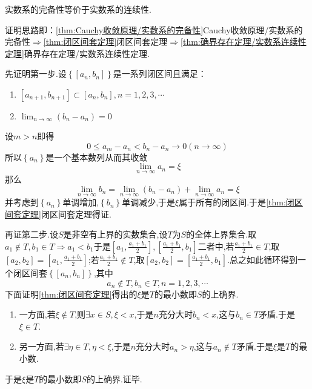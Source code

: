 \begin{formal}
    \begin{theorem}[实数系的连续性与完备性]\label{thm:实数系的连续性与完备性}
        实数系的完备性等价于实数系的连续性.
    \end{theorem}
    \begin{Proof}
        证明思路即：\cref{thm:Cauchy收敛原理/实数系的完备性}\textup{Cauchy}收敛原理/实数系的完备性$\Longrightarrow$\cref{thm:闭区间套定理}闭区间套定理$\Longrightarrow$\cref{thm:确界存在定理/实数系连续性定理}确界存在定理/实数系连续性定理.

        先证明第一步.设$\left\{\left[a_n,b_n\right]\right\}$是一系列闭区间且满足：\begin{enumerate}[label={\textup{(\arabic*)}}]
            \item $\left[a_{n+1},b_{n+1}\right]\subset\left[a_n,b_n\right],n=1,2,3,\cdots$
            \item $\displaystyle\lim_{n\to\infty}\left(b_n-a_n\right)=0$
        \end{enumerate}设$m>n$即得\[
        0\leqslant a_m-a_n<b_n-a_n\to0\left(
            n\to\infty
        \right)
        \]所以$\left\{a_n\right\}$是一个基本数列从而其收敛\[
        \lim_{n\to\infty}a_n=\xi
        \]那么\[
        \lim_{n\to\infty}b_n=\lim_{n\to\infty}\left(b_n-a_n\right)+\lim_{n\to\infty}a_n=\xi
        \]并考虑到$\left\{a_n\right\}$单调增加,$\left\{b_n\right\}$单调减少,于是$\xi$属于所有的闭区间.于是\cref{thm:闭区间套定理}闭区间套定理得证.

        再证第二步.设$S$是非空有上界的实数集合,设$T$为$S$的全体上界集合.取$a_1\notin T,b_1\in T\Longrightarrow a_1<b_1$于是$\displaystyle\left[a_1,\frac{a_1+b_1}{2}\right],\left[\frac{a_1+b_1}{2},b_1\right]$二者中,若$\displaystyle\frac{a_1+b_1}{2}\in T$,取$\displaystyle\left[a_2,b_2\right]=\left[a_1,\frac{a_1+b_1}{2}\right]$;若$\displaystyle\frac{a_1+b_1}{2}\notin T$,取$\displaystyle\left[a_2,b_2\right]=\left[\frac{a_1+b_1}{2},b_1\right]$.总之如此循环得到一个闭区间套$\left\{\left[a_n,b_n\right]\right\}$,其中\[
        a_n\notin T,b_n\in T,n=1,2,3,\cdots
        \]下面证明\cref{thm:闭区间套定理}得出的$\xi$是$T$的最小数即$S$的上确界.\begin{enumerate}[label={\textup{(\arabic*)}}]
            \item 一方面,若$\xi\notin T$,则$\exists x\in S,\xi<x$,于是$n$充分大时$b_n<x$,这与$b_n\in T$矛盾.于是$\xi\in T$.
            \item 另一方面,若$\exists \eta\in T,\eta<\xi$,于是$n$充分大时$a_n>\eta$,这与$a_n\notin T$矛盾.于是$\xi$是$T$的最小数.
        \end{enumerate}于是$\xi$是$T$的最小数即$S$的上确界.证毕.
    \end{Proof}
\end{formal}
